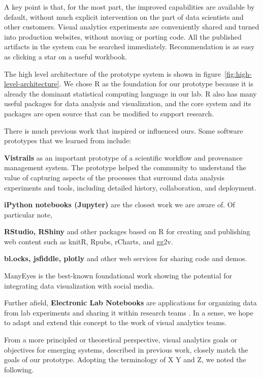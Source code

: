 A key point is that, for the most part, the improved capabilities are
available by default, without much explicit intervention on the part of
data scientists and other customers. Visual analytics experiments are
conveniently shared and turned into production websites, without moving
or porting code. All the published artifacts in the system can be
searched immediately. Recommendation is as easy as clicking a star
on a useful workbook.

The high level architecture of the prototype system
is shown in figure~\ref{fig:high-level-architecture}.
We chose R as the foundation for our prototype because it is already
the dominant statistical computing language in our lab.
R also has many useful packages for data analysis and visualization,
and the core system and its packages are open source that can be modified to
support research. 

There is much previous work that inspired or influenced ours. Some
software prototypes that we learned from include:

{\bf Vistrails} as an important prototype of a scientific workflow
and provenance management system. The prototype helped the community
to understand the value of capturing aspects of the processes that
surround data analysis experiments and tools, including detailed
history, collaboration, and deployment.

{\bf iPython notebooks (Jupyter)} are the closest work we are aware of.
Of particular note, 

{\bf RStudio, RShiny} and other packages based on R for creating and
publishing web content such as knitR, Rpubs, rCharts, and gg2v.

{\bf bl.ocks, jsfiddle, plotly} and other web services for sharing code
and demos.

{ManyEyes} is the best-known foundational work showing the potential for
integrating data visualization with social media.

Further afield, {\bf Electronic Lab Notebooks} are applications for organizing
data from lab experiments and sharing it within research teams \cite{Rubacha:ELN:2011}. In a sense, we hope to adapt and extend this concept to the work of
visual analytics teams.

From a more principled or theoretical perspective, visual analytics goals
or objectives for emerging systems, described in previous work, closely match
the goals of our prototype.  Adopting the terminology of X Y and Z, we noted
the following.

